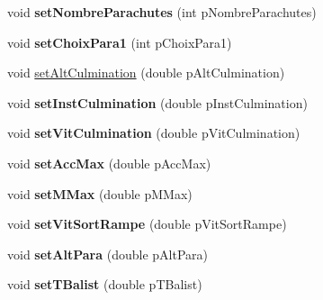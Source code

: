 \begin{DoxyCompactItemize}
\mbox{\label{classpackage_i_h_m_1_1_fusee_a5b3de7fcfa2b63969b5c51cb0172d517}} 
void {\bfseries set\+Nombre\+Parachutes} (int p\+Nombre\+Parachutes)
\item 
\mbox{\label{classpackage_i_h_m_1_1_fusee_ac5b5249cb12a38209d3a8b5f1770f7bd}} 
void {\bfseries set\+Choix\+Para1} (int p\+Choix\+Para1)
\item 
void \mbox{\hyperlink{classpackage_i_h_m_1_1_fusee_a267ec95b3ae1a0746cb8f44f3fa7492c}{set\+Alt\+Culmination}} (double p\+Alt\+Culmination)
\item 
\mbox{\label{classpackage_i_h_m_1_1_fusee_ad4e7aed5da90790b85a55f449dc369bf}} 
void {\bfseries set\+Inst\+Culmination} (double p\+Inst\+Culmination)
\item 
\mbox{\label{classpackage_i_h_m_1_1_fusee_a5769426d43b950c1aab90616ae88901b}} 
void {\bfseries set\+Vit\+Culmination} (double p\+Vit\+Culmination)
\item 
\mbox{\label{classpackage_i_h_m_1_1_fusee_afc465cf007d83a12e39f9c6d6480c598}} 
void {\bfseries set\+Acc\+Max} (double p\+Acc\+Max)
\item 
\mbox{\label{classpackage_i_h_m_1_1_fusee_accd7cf5c7efadea4cce60020c27df3fa}} 
void {\bfseries set\+M\+Max} (double p\+M\+Max)
\item 
\mbox{\label{classpackage_i_h_m_1_1_fusee_ae1ba33b020a9b44ea688ddb92f6951fa}} 
void {\bfseries set\+Vit\+Sort\+Rampe} (double p\+Vit\+Sort\+Rampe)
\item 
\mbox{\label{classpackage_i_h_m_1_1_fusee_a9194203543c28c7c50b1a029d12dd784}} 
void {\bfseries set\+Alt\+Para} (double p\+Alt\+Para)
\item 
\mbox{\label{classpackage_i_h_m_1_1_fusee_a221471781c00bad553488bd17a896957}} 
void {\bfseries set\+T\+Balist} (double p\+T\+Balist)
\item 
\mbox{\label{classpackage_i_h_m_1_1_fusee_a8fb6a108f0382c97bfa361f9455f20f6}} 

\end{DoxyCompactItemize}
